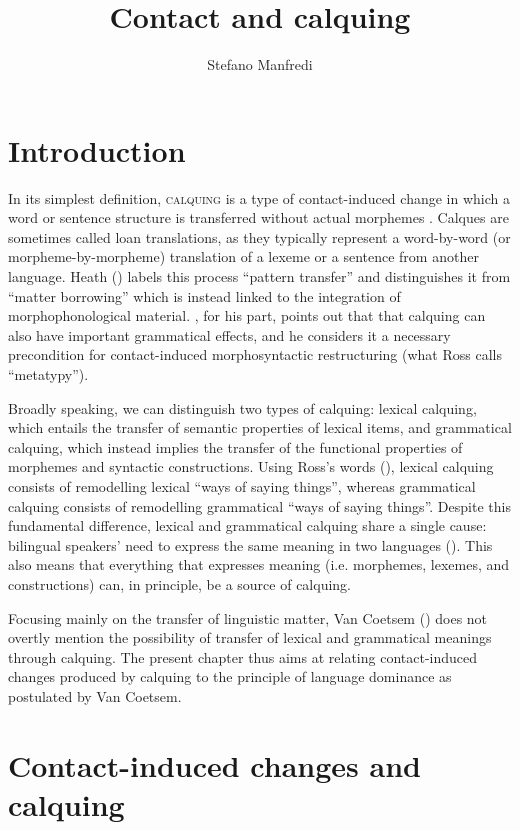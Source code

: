 \documentclass[output=paper]{langsci/langscibook}
\author{Stefano Manfredi\affiliation{CNRS, SeDyL}}
\title{Contact and calquing}
\begin{document}
\maketitle 
  

\section{Introduction}

In its simplest definition, \textsc{calquing} is a type of contact-induced change in which a word or sentence structure is transferred without actual morphemes \citep[260]{Thomason2001}. Calques are sometimes called loan translations, as they typically represent a word-by-word (or morpheme-by-morpheme) translation of a lexeme or a sentence from another language. Heath (\citeyear[367]{Heath1984}) labels this process “pattern transfer” and distinguishes it from “matter borrowing” which is instead linked to the integration of morphophonological material. \cite{Ross2007}, for his part, points out that that calquing can also have important grammatical effects, and he considers it a necessary precondition for contact-induced morphosyntactic restructuring (what Ross calls “metatypy”).  

Broadly speaking, we can distinguish two types of calquing: lexical calquing, which entails the transfer of semantic properties of lexical items, and grammatical calquing, which instead implies the transfer of the functional properties of morphemes and syntactic constructions. Using Ross’s words (\citeyear[126]{Ross2007}), lexical calquing consists of remodelling lexical “ways of saying things”, whereas grammatical calquing consists of remodelling grammatical “ways of saying things”. Despite this fundamental difference, lexical and grammatical calquing share a single cause: bilingual speakers’ need to express the same meaning in two languages (\citealt[32]{Sasse1992}). This also means that everything that expresses meaning (i.e. morphemes, lexemes, and constructions) can, in principle, be a source of calquing. 

Focusing mainly on the transfer of linguistic matter, Van Coetsem (\citeyear{VanCoetsem1988}) does not overtly mention the possibility of transfer of lexical and grammatical meanings through calquing. The present chapter thus aims at relating contact-induced changes produced by calquing to the principle of language dominance as postulated by Van Coetsem. 


 \section{Contact-induced changes and calquing}
\end{document}
